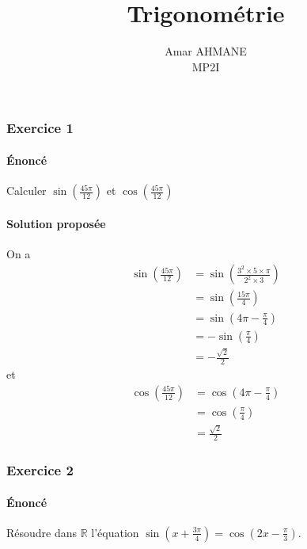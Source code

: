 \documentclass[10pt]{article}
\title{\huge\textbf{Trigonométrie}}
\author{Amar AHMANE\\ MP2I}
\date{}
\newcommand{\pr}[1]{\left(#1\right)}
\def\R{\mathbb R}
\begin{document}
    \maketitle
    \subsubsection*{Exercice 1}
    \paragraph{Énoncé} Calculer $\sin\pr{\frac{45\pi}{12}}$ et $\cos\pr{\frac{45\pi}{12}}$
    \paragraph{Solution proposée} On a
    \begin{align*}
        \sin\pr{\frac{45\pi}{12}} &= \sin\pr{\frac{3^2\times 5\times\pi}{2^2\times 3}}\\
                                  &= \sin\pr{\frac{15\pi}{4}}\\
                                  &= \sin\pr{4\pi-\frac{\pi}{4}}\\
                                  &= -\sin\pr{\frac\pi4}\\
                                  &= -\frac{\sqrt{2}}2
    \end{align*}
    et
    \begin{align*}
        \cos\pr{\frac{45\pi}{12}} &= \cos\pr{4\pi-\frac{\pi}{4}}\\
                                  &= \cos\pr{\frac\pi4}\\
                                  &= \frac{\sqrt{2}}2
    \end{align*}

    \subsubsection*{Exercice 2}
    \paragraph{Énoncé} Résoudre dans $\R$ l'équation $\sin\pr{x+\frac{3\pi}4}=\cos\pr{2x-\frac\pi3}$.
\end{document}

